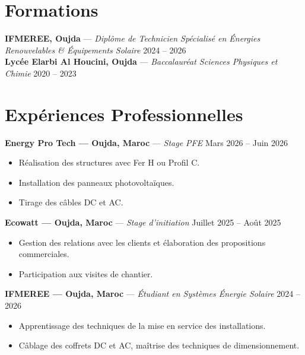 \documentclass[9.5pt, a4paper]{article}
\begin{document}
\section{Formations}
\noindent
\textbf{IFMEREE, Oujda} --- \textit{Diplôme de Technicien Spécialisé en Énergies Renouvelables \& Équipements Solaire} \hfill 2024 -- 2026\\
\textbf{Lycée Elarbi Al Houcini, Oujda} --- \textit{Baccalauréat Sciences Physiques et Chimie} \hfill 2020 -- 2023

\section{Expériences Professionnelles}

\noindent
\textbf{Energy Pro Tech --- Oujda, Maroc} --- \textit{Stage PFE} \hfill Mars 2026 -- Juin 2026
\begin{itemize}[leftmargin=1.5em, label=---, itemsep=1pt, topsep=1pt]
    \item Réalisation des structures avec Fer H ou Profil C.
    \item Installation des panneaux photovoltaïques.
    \item Tirage des câbles DC et AC.
\end{itemize}

\vspace{0.1em}
\noindent
\textbf{Ecowatt --- Oujda, Maroc} --- \textit{Stage d'initiation} \hfill Juillet 2025 -- Août 2025
\begin{itemize}[leftmargin=1.5em, label=---, itemsep=1pt, topsep=1pt]
    \item Gestion des relations avec les clients et élaboration des propositions commerciales.
    \item Participation aux visites de chantier.
\end{itemize}

\vspace{0.1em}
\noindent
\textbf{IFMEREE --- Oujda, Maroc} --- \textit{Étudiant en Systèmes Énergie Solaire} \hfill 2024 -- 2026
\begin{itemize}[leftmargin=1.5em, label=---, itemsep=1pt, topsep=1pt]
    \item Apprentissage des techniques de la mise en service des installations.
    \item Câblage des coffrets DC et AC, maîtrise des techniques de dimensionnement.
\end{itemize}
\end{document}
